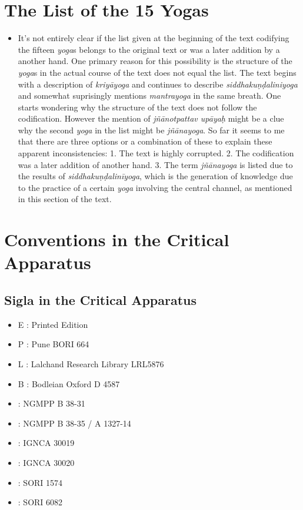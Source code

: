 \chapter{The List of the 15 Yogas}
\begin{itemize}
\item It's not entirely clear if the list given at the beginning of the text codifying the fifteen \textit{yoga}s belongs to the original text or was a later addition by a another hand. One primary reason for this possibility is the structure of the \textit{yoga}s in the actual course of the text does not equal the list. The text begins with a description of \textit{kriyāyoga} and continues to describe \textit{siddhakuṇḍaliniyoga} and somewhat suprisingly mentions \textit{mantrayoga} in the same breath. One starts wondering why the structure of the text does not follow the codification. However the mention of \textit{jñānotpattav upāyaḥ} might be a clue why the second \textit{yoga} in the list might be \textit{jñānayoga}. So far it seems to me that there are three options or a combination of these to explain these apparent inconsistencies: 1. The text is highly corrupted. 2. The codification was a later addition of another hand. 3. The term \textit{jñānayoga} is listed due to the results of \textit{siddhakuṇḍalinīyoga}, which is the generation of knowledge due to the practice of a certain \textit{yoga} involving the central channel, as mentioned in this section of the text.
\end{itemize}

\chapter{Conventions in the Critical Apparatus}
\section{Sigla in the Critical Apparatus}

\begin{itemize}
\item E : Printed Edition
\item P : Pune BORI 664
\item L : Lalchand Research Library LRL5876
\item B : Bodleian Oxford D 4587
\item \None : NGMPP B 38-31
\item \Ntwo : NGMPP B 38-35 / A 1327-14
\item \Done : IGNCA 30019
\item \Dtwo : IGNCA 30020
\item \Uone : SORI 1574
\item \Utwo: SORI 6082
\end{itemize}

